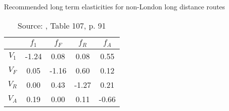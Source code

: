 
\begin{table}[H] \centering 
  \caption{Recommended long term elasticities for non-London long distance routes} 
  \label{tbl:its-systra_elasticities} 
{\renewcommand\arraystretch{1.25}}
\begin{tabular} {ccccc}
\toprule
	    & $f_{1}$ & $f_{F}$ & $f_{R}$ & $f_{A}$ \\
\hline
$V_1$   & -1.24   & 0.08    & 0.08    & 0.55   \\
$V_F$   & 0.05    & -1.16   & 0.60    & 0.12   \\
$V_R$   & 0.00    & 0.43    & -1.27   & 0.21   \\
$V_A$   & 0.19    & 0.00    & 0.11    & -0.66  \\
\bottomrule
\end{tabular}%
\caption*{Source: \cite{its-systra-report} , Table 107, p. 91}
\end{table} 

